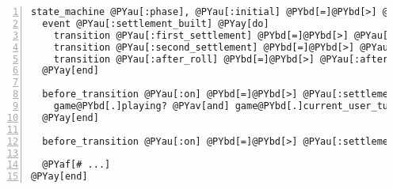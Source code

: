 \begin{Verbatim}[commandchars=@\[\],numbers=left,firstnumber=1,stepnumber=1]
state_machine @PYau[:phase], @PYau[:initial] @PYbd[=]@PYbd[>] @PYau[:first_settlement] @PYay[do]
  event @PYau[:settlement_built] @PYay[do]
    transition @PYau[:first_settlement] @PYbd[=]@PYbd[>] @PYau[:first_road]
    transition @PYau[:second_settlement] @PYbd[=]@PYbd[>] @PYau[:second_road]
    transition @PYau[:after_roll] @PYbd[=]@PYbd[>] @PYau[:after_roll]
  @PYay[end]

  before_transition @PYau[:on] @PYbd[=]@PYbd[>] @PYau[:settlement_built] @PYay[do] @PYbd[|]game, transition@PYbd[|]
    game@PYbd[.]playing? @PYav[and] game@PYbd[.]current_user_turn?(@PYbd[*]transition@PYbd[.]args)
  @PYay[end]

  before_transition @PYau[:on] @PYbd[=]@PYbd[>] @PYau[:settlement_built], @PYau[:do] @PYbd[=]@PYbd[>] @PYau[:longest_road]

  @PYaf[# ...]
@PYay[end]
\end{Verbatim}
